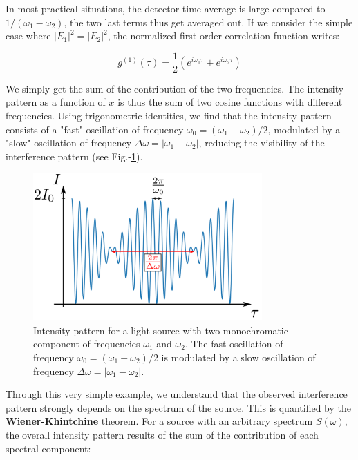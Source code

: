 In most practical situations, the detector time average is large compared to $1/(\omega_1 - \omega_2)$, the two last terms thus get averaged out. If we consider the simple case where $|E_1|^2=|E_2|^2$, the normalized first-order correlation function writes:

\begin{equation}
    g^{(1)} (\tau) = \frac{1}{2} (e^{i \omega_1 \tau} + e^{i \omega_2 \tau})
\end{equation}

We simply get the sum of the contribution of the two frequencies. The intensity pattern as a function of $x$ is thus the sum of two cosine functions with different frequencies. Using trigonometric identities, we find that the intensity pattern consists of a "fast" oscillation of frequency $\omega_0=(\omega_1 + \omega_2)/2$, modulated by a "slow" oscillation of frequency $\Delta \omega = |\omega_1 - \omega_2|$, reducing the visibility of the interference pattern (see Fig.-\ref{fig:michelson_two_lambda}).

\begin{figure}
    \centering
    \includegraphics[width=0.78\textwidth]{Fig/Chapter1/michelson_two_lambda.png}
    \caption{Intensity pattern for a light source with two monochromatic component of frequencies $\omega_1$ and $\omega_2$. The fast oscillation of frequency $\omega_0=(\omega_1+\omega_2)/2$ is modulated by a slow oscillation of frequency $\Delta \omega = |\omega_1 - \omega_2|$.}
    \label{fig:michelson_two_lambda}
\end{figure}

Through this very simple example, we understand that the observed interference pattern strongly depends on the spectrum of the source. This is quantified by the \textbf{Wiener-Khintchine} theorem. For a source with an arbitrary spectrum $S(\omega)$, the overall intensity pattern results of the sum of the contribution of each spectral component:

